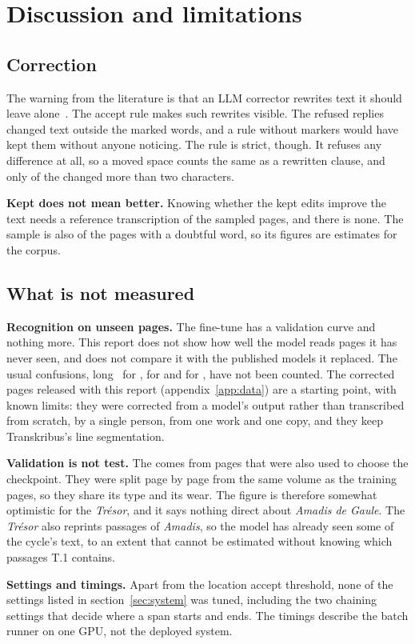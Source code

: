 \section{Discussion and limitations}
\label{sec:errors}
\label{sec:limitations}

\subsection{Correction}

The warning from the literature is that an LLM corrector rewrites text it
should leave alone~\cite{kanerva2025nofreelunches, ehrmann2026hipeocrepair}.
The accept rule makes such rewrites visible. The \corrRewritesCaught{} refused
replies changed text outside the marked words, and a rule without markers would
have kept them without anyone noticing. The rule is strict, though. It refuses
any difference at all, so a moved space counts the same as a rewritten clause,
and only \corrRewritesSubstantial{} of the \corrRewritesCaught{} changed more
than two characters.

\textbf{Kept does not mean better.} Knowing whether the kept edits improve the
text needs a reference transcription of the sampled pages, and there is none.
The sample is also \corrPages{} of the \corrReachPagesWithSpan{} pages with a
doubtful word, so its figures are estimates for the corpus.

\subsection{What is not measured}

\textbf{Recognition on unseen pages.} The fine-tune has a validation curve and
nothing more. This report does not show how well the model reads pages it has
never seen, and does not compare it with the published models it replaced. The
usual confusions, long~ for ,
 for  and  for , have not been counted. The
corrected pages released with this report (appendix~\ref{app:data}) are a
starting point, with known limits: they were corrected from a model's output
rather than transcribed from scratch, by a single person, from one work and one
copy, and they keep Transkribus's line segmentation.

\textbf{Validation is not test.} The \trainCer{} comes from \trainPagesVal{}
pages that were also used to choose the checkpoint. They were split page by
page from the same volume as the training pages, so they share its type and its
wear. The figure is therefore somewhat optimistic for the \emph{Trésor}, and it
says nothing direct about \emph{Amadis de Gaule}. The \emph{Trésor} also
reprints passages of \emph{Amadis}, so the model has already seen some of the
cycle's text, to an extent that cannot be estimated without knowing which
passages T.1 contains.

\textbf{Settings and timings.} Apart from the location accept threshold, none
of the settings listed in section~\ref{sec:system} was tuned, including the two
chaining settings that decide where a span starts and ends. The timings
describe the batch runner on one GPU, not the deployed system.
